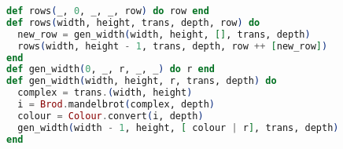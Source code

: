 \begin{lstlisting}[language=Elixir]
def rows(_, 0, _, _, row) do row end
def rows(width, height, trans, depth, row) do
  new_row = gen_width(width, height, [], trans, depth)
  rows(width, height - 1, trans, depth, row ++ [new_row])
end
def gen_width(0, _, r, _, _) do r end
def gen_width(width, height, r, trans, depth) do
  complex = trans.(width, height)
  i = Brod.mandelbrot(complex, depth)
  colour = Colour.convert(i, depth)
  gen_width(width - 1, height, [ colour | r], trans, depth)
end
\end{lstlisting}